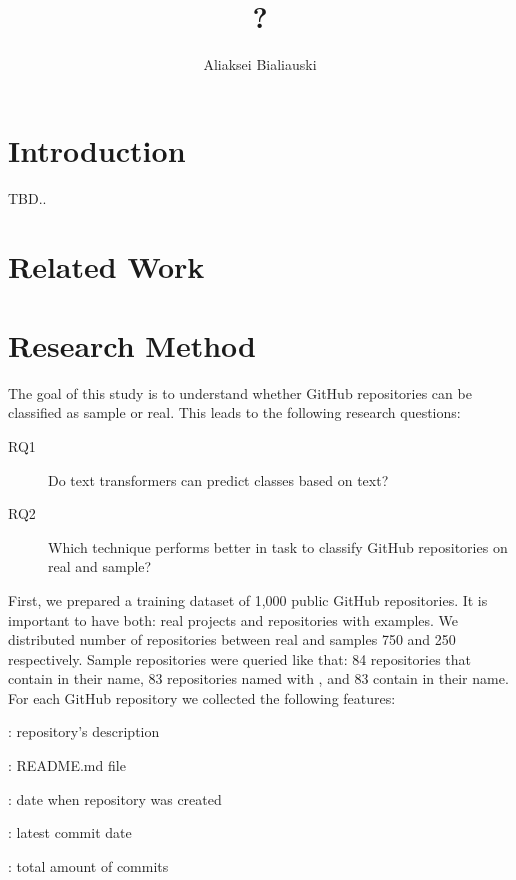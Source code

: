 \documentclass[sigplan,nonacm,review]{acmart}
\title{?}
\author{Aliaksei Bialiauski}
\affiliation{
    \institution{?}
    \city{Minsk}
    \country{Belarus}
}
\begin{document}
\maketitle


\section{Introduction}\label{sec:introduction}
TBD.. \citet{testCitation}


\section{Related Work}\label{sec:related}


\section{Research Method}\label{sec:method}
The goal of this study is to understand whether GitHub repositories can be
classified as sample or real. This leads to the following research questions:
\begin{description}
    \item[RQ1] Do text transformers can predict classes based on text?
    \item[RQ2] Which technique performs better in task to classify GitHub repositories on real and sample?
\end{description}

First, we prepared a training dataset of 1,000 public GitHub repositories.
It is important to have both: real projects and repositories with examples.
We distributed number of repositories between real and samples 750 and 250
respectively. Sample repositories were queried like that: 84 repositories
that contain  in their name, 83 repositories named with
, and 83 contain  in their name.
For each GitHub repository we collected the following features:
\begin{inparaenum}[1)]
    \item {}: repository's description
    \item {}: README.md file
    \item {}: date when repository was created
    \item {}: latest commit date
    \item {}: total amount of commits
\end{inparaenum}
\end{document}
